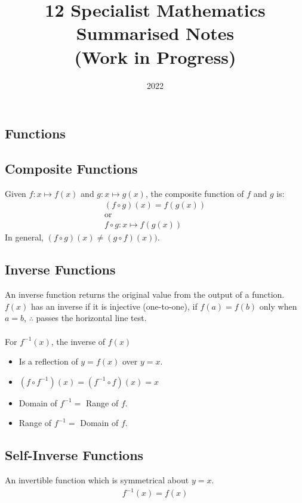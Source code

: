 \documentclass[10pt, a4paper, titlepage]{article}
\title{12 Specialist Mathematics Summarised Notes \\ (Work in Progress)}
\author{}
\date{2022}
\begin{document}
\maketitle
\begin{multicols*}{3}

\section{Functions}
	\subsection{Composite Functions}
	Given $f:x\mapsto f(x)$ and $g:x\mapsto g(x)$, the composite function of $f$ and $g$ is:
	\begin{gather}
		(f\circ g)(x)=f(g(x))\\
		\text{or}\\
		f\circ g:x\mapsto f(g(x))
	\end{gather}
	In general, $(f\circ g)(x)\neq (g\circ f)(x))$.

	\dotfill
	\subsection{Inverse Functions}
	An inverse function returns the original value from the output of a function.\\
	$f(x)$ has an inverse if it is injective (one-to-one), if $f(a)=f(b)$ only when $a=b$, $\therefore$ passes the horizontal line test.\\\\
	For $f^{-1}(x)$, the inverse of $f(x)$
	\begin{itemize}
		\item Is a reflection of $y=f(x)$ over $y=x$.
		\item $(f\circ f^{-1})(x)=(f^{-1}\circ f)(x)=x$
		\item Domain of $f^{-1}=$ Range of $f$.
		\item Range of $f^{-1}=$ Domain of $f$.
	\end{itemize}

	\dotfill
	\subsection{Self-Inverse Functions}
	An invertible function which is symmetrical about $y=x$.
	\begin{align}
		f^{-1}(x)=f(x)
	\end{align}

	\dotfill

\end{multicols*}
\end{document}
